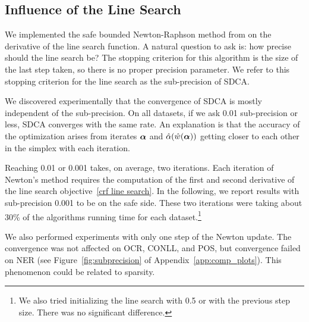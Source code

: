 \subsection{Influence of the Line Search}\label{experiment line search}

We implemented the safe bounded Newton-Raphson method from \citet[Section 9.4]{press_numerical_1992} on the derivative of the line search function.
A natural question to ask is: how precise should the line search be?
The stopping criterion for this algorithm is the size of the last step taken, so there is no proper precision parameter.
We refer to this stopping criterion for the line search as the sub-precision of SDCA.

We discovered experimentally that the convergence of SDCA is mostly independent of the sub-precision.
On all datasets, if we ask 0.01 sub-precision or less, SDCA converges with the same rate.
An explanation is that the accuracy of the optimization arises from iterates $\boldsymbol{\alpha}$ and $\hat \alpha(\hat w(\boldsymbol{\alpha}))$ getting closer to each other in the simplex with each iteration.

Reaching 0.01 or 0.001 takes, on average, two iterations.
Each iteration of Newton's method requires the computation of the first and second derivative of the line search objective~\eqref{crf line search}.
In the following, we report results with sub-precision 0.001 to be on the safe side.
These two iterations were taking about 30\% of the algorithms running time for each dataset.\footnote{
	We also tried initializing the line search with 0.5 or with the previous step size.
	There was no significant difference.
}

We also performed experiments with only one step of the Newton update.
The convergence was not affected on OCR, CONLL, and POS, but convergence failed on NER (see Figure~\ref{fig:subprecision} of Appendix~\ref{app:comp_plots}).
This phenomenon could be related to sparsity.

